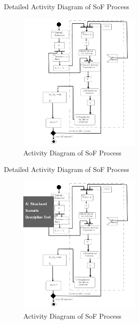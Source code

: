 \documentclass{beamer}
\begin{document}
\begin{frame}{Detailed Activity Diagram of SoF Process}
  \begin{figure}
    \includegraphics[width=2.4in]{img/2.PNG}
    \caption{Activity Diagram of SoF Process}
  \end{figure}
\end{frame}

\begin{frame}{Detailed Activity Diagram of SoF Process}
  \begin{figure}
    \includegraphics[width=2.4in]{img/2_1.PNG}
    \caption{Activity Diagram of SoF Process}
  \end{figure}
\end{frame}
\end{document}
